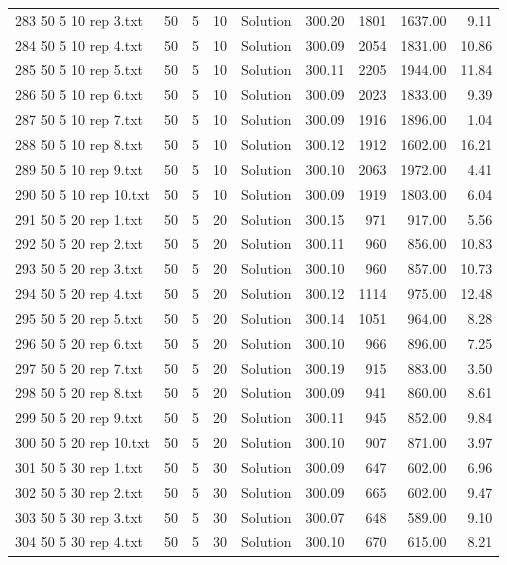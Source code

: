 \begin{longtable}{lrrllrrrr}
283 50 5 10 rep 3.txt & 50 & 5 & 10 & Solution & 300.20 & 1801 & 1637.00 &  9.11\\
284 50 5 10 rep 4.txt & 50 & 5 & 10 & Solution & 300.09 & 2054 & 1831.00 & 10.86\\
285 50 5 10 rep 5.txt & 50 & 5 & 10 & Solution & 300.11 & 2205 & 1944.00 & 11.84\\
286 50 5 10 rep 6.txt & 50 & 5 & 10 & Solution & 300.09 & 2023 & 1833.00 &  9.39\\
287 50 5 10 rep 7.txt & 50 & 5 & 10 & Solution & 300.09 & 1916 & 1896.00 &  1.04\\
288 50 5 10 rep 8.txt & 50 & 5 & 10 & Solution & 300.12 & 1912 & 1602.00 & 16.21\\
289 50 5 10 rep 9.txt & 50 & 5 & 10 & Solution & 300.10 & 2063 & 1972.00 &  4.41\\
290 50 5 10 rep 10.txt & 50 & 5 & 10 & Solution & 300.09 & 1919 & 1803.00 &  6.04\\
291 50 5 20 rep 1.txt & 50 & 5 & 20 & Solution & 300.15 & 971 & 917.00 &  5.56\\
292 50 5 20 rep 2.txt & 50 & 5 & 20 & Solution & 300.11 & 960 & 856.00 & 10.83\\
293 50 5 20 rep 3.txt & 50 & 5 & 20 & Solution & 300.10 & 960 & 857.00 & 10.73\\
294 50 5 20 rep 4.txt & 50 & 5 & 20 & Solution & 300.12 & 1114 & 975.00 & 12.48\\
295 50 5 20 rep 5.txt & 50 & 5 & 20 & Solution & 300.14 & 1051 & 964.00 &  8.28\\
296 50 5 20 rep 6.txt & 50 & 5 & 20 & Solution & 300.10 & 966 & 896.00 &  7.25\\
297 50 5 20 rep 7.txt & 50 & 5 & 20 & Solution & 300.19 & 915 & 883.00 &  3.50\\
298 50 5 20 rep 8.txt & 50 & 5 & 20 & Solution & 300.09 & 941 & 860.00 &  8.61\\
299 50 5 20 rep 9.txt & 50 & 5 & 20 & Solution & 300.11 & 945 & 852.00 &  9.84\\
300 50 5 20 rep 10.txt & 50 & 5 & 20 & Solution & 300.10 & 907 & 871.00 &  3.97\\
301 50 5 30 rep 1.txt & 50 & 5 & 30 & Solution & 300.09 & 647 & 602.00 &  6.96\\
302 50 5 30 rep 2.txt & 50 & 5 & 30 & Solution & 300.09 & 665 & 602.00 &  9.47\\
303 50 5 30 rep 3.txt & 50 & 5 & 30 & Solution & 300.07 & 648 & 589.00 &  9.10\\
304 50 5 30 rep 4.txt & 50 & 5 & 30 & Solution & 300.10 & 670 & 615.00 &  8.21\\

\end{longtable}
